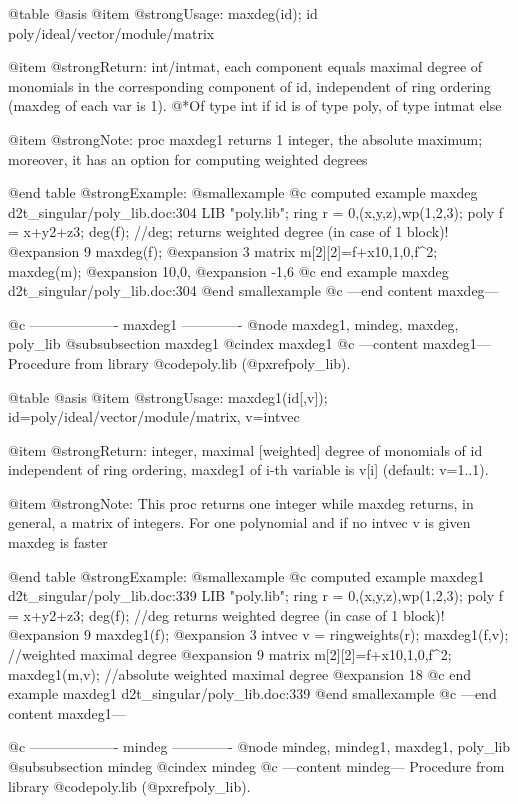@table @asis
@item @strong{Usage:}
maxdeg(id); id poly/ideal/vector/module/matrix

@item @strong{Return:}
int/intmat, each component equals maximal degree of monomials in the
corresponding component of id, independent of ring ordering
(maxdeg of each var is 1).
@*Of type int if id is of type poly, of type intmat else

@item @strong{Note:}
proc maxdeg1 returns 1 integer, the absolute maximum; moreover, it has
an option for computing weighted degrees

@end table
@strong{Example:}
@smallexample
@c computed example maxdeg d2t_singular/poly_lib.doc:304 
LIB "poly.lib";
ring r = 0,(x,y,z),wp(1,2,3);
poly f = x+y2+z3;
deg(f);             //deg; returns weighted degree (in case of 1 block)!
@expansion{} 9
maxdeg(f);
@expansion{} 3
matrix m[2][2]=f+x10,1,0,f^2;
maxdeg(m);
@expansion{} 10,0,
@expansion{} -1,6 
@c end example maxdeg d2t_singular/poly_lib.doc:304
@end smallexample
@c ---end content maxdeg---

@c ------------------- maxdeg1 -------------
@node maxdeg1, mindeg, maxdeg, poly_lib
@subsubsection maxdeg1
@cindex maxdeg1
@c ---content maxdeg1---
Procedure from library @code{poly.lib} (@pxref{poly_lib}).

@table @asis
@item @strong{Usage:}
maxdeg1(id[,v]); id=poly/ideal/vector/module/matrix, v=intvec

@item @strong{Return:}
integer, maximal [weighted] degree of monomials of id independent of
ring ordering, maxdeg1 of i-th variable is v[i] (default: v=1..1).

@item @strong{Note:}
This proc returns one integer while maxdeg returns, in general,
a matrix of integers. For one polynomial and if no intvec v is given
maxdeg is faster

@end table
@strong{Example:}
@smallexample
@c computed example maxdeg1 d2t_singular/poly_lib.doc:339 
LIB "poly.lib";
ring r = 0,(x,y,z),wp(1,2,3);
poly f = x+y2+z3;
deg(f);            //deg returns weighted degree (in case of 1 block)!
@expansion{} 9
maxdeg1(f);
@expansion{} 3
intvec v = ringweights(r);
maxdeg1(f,v);                        //weighted maximal degree
@expansion{} 9
matrix m[2][2]=f+x10,1,0,f^2;
maxdeg1(m,v);                        //absolute weighted maximal degree
@expansion{} 18
@c end example maxdeg1 d2t_singular/poly_lib.doc:339
@end smallexample
@c ---end content maxdeg1---

@c ------------------- mindeg -------------
@node mindeg, mindeg1, maxdeg1, poly_lib
@subsubsection mindeg
@cindex mindeg
@c ---content mindeg---
Procedure from library @code{poly.lib} (@pxref{poly_lib}).

